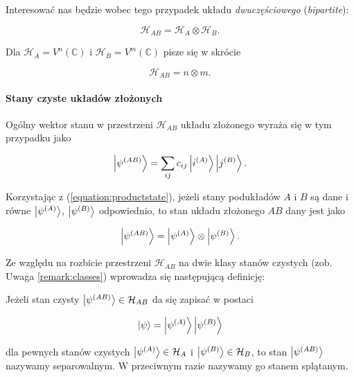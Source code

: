 Interesować nas będzie wobec tego przypadek układu \textit{dwuczęściowego} (\textit{bipartite}):

$$
    \mathcal{H}_{AB} = \mathcal{H}_{A} \otimes \mathcal{H}_{B}.
$$

\begin{remark}
    Dla $\mathcal{H}_A = V ^ n(\mathbb{C})$ i $\mathcal{H}_B = V ^ m(\mathbb{C})$ pisze się w skrócie

    \begin{equation}
        \label{equation:bipartite}
        \mathcal{H}_{AB} = n \otimes m.
    \end{equation}
\end{remark}

\paragraph{Stany czyste układów złożonych}

Ogólny wektor stanu w przestrzeni $\mathcal{H}_{AB}$ układu złożonego wyraża się w tym przypadku jako

\begin{equation}
    \label{equation:complexpure}
    \ket{\psi^{(AB)}} = \sum\limits_{ij} c_{ij} \ket{i^{(A)}} \ket{j^{(B)}}.
\end{equation}

Korzystając z (\ref{equation:productstate}), jeżeli stany podukładów $A$ i $B$ są dane i równe $\ket{\psi^{(A)}}$, $\ket{\psi^{(B)}}$ odpowiednio, to stan układu złożonego $AB$ dany jest jako

$$
    \ket{\psi^{(AB)}} = \ket{\psi^{(A)}} \otimes \ket{\psi^{(B)}}.
$$

Ze względu na rozbicie przestrzeni $\mathcal{H}_{AB}$ na dwie klasy stanów czystych (zob. Uwaga \ref{remark:classes}) wprowadza się następującą definicję:

\begin{definition}
    Jeżeli stan czysty $\ket{\psi^{(AB)}} \in \mathcal{H}_{AB}$ da się zapisać w postaci

    $$
        \ket{\psi} = \ket{\psi ^ {(A)}} \ket{\psi ^ {(B)}}
    $$

    dla pewnych stanów czystych $\ket{\psi ^ {(A)}} \in \mathcal{H}_A$ i $\ket{\psi ^ {(B)}} \in \mathcal{H}_B$, to stan $\ket{\psi^{(AB)}}$ nazywamy separowalnym. W przeciwnym razie nazywamy go stanem splątanym.
\end{definition}

